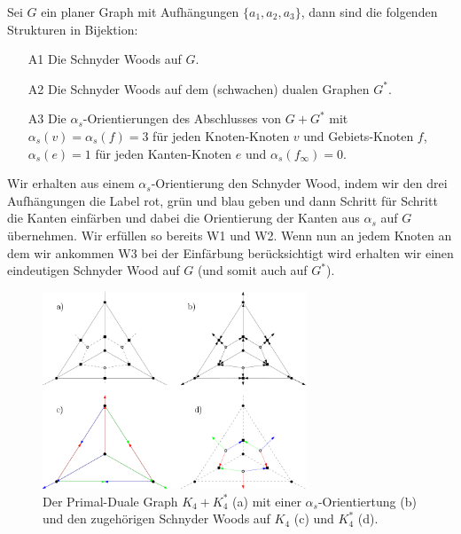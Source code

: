 \begin{theorem}\label{alpha_bij}
Sei $G$ ein planer Graph mit Aufhängungen $\{a_1,a_2,a_3\}$, dann sind die folgenden Strukturen in Bijektion:
\begin{itemize}
\item [A1] Die Schnyder Woods auf $G$.
\item [A2] Die Schnyder Woods auf dem (schwachen) dualen Graphen $G^*$.
\item [A3] Die $\alpha_{s}$-Orientierungen des Abschlusses von $G+G^*$ mit $\alpha_s(v) = \alpha_s(f) = 3$ für jeden Knoten-Knoten $v$ und Gebiets-Knoten $f$,  $\alpha_s(e) = 1$ für jeden Kanten-Knoten $e$ und  $\alpha_s(f_\infty) = 0$.
\end{itemize}
\end{theorem}

\begin{remark}
Wir erhalten aus einem $\alpha_s$-Orientierung den Schnyder Wood, indem wir den drei Aufhängungen die Label rot, grün und blau geben und dann Schritt für Schritt die Kanten einfärben und dabei die Orientierung der Kanten aus $\alpha_s$ auf $G$ übernehmen. Wir erfüllen so bereits W1 und W2. Wenn nun an jedem Knoten an dem wir ankommen W3 bei der Einfärbung berücksichtigt wird erhalten wir einen eindeutigen Schnyder Wood auf $G$ (und somit auch auf $G^*$).
\end{remark}

\begin{figure}
	\centering
	\includegraphics[width=0.7\textwidth]{alpha_ex2.png}
  \caption{ Der Primal-Duale Graph $K_4+K_4^*$ (a) mit einer $\alpha_s$-Orientiertung (b) und den zugehörigen Schnyder Woods auf $K_4$ (c) und $K^*_4$ (d). }
\end{figure}